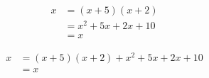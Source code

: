 \documentclass{minimal}
\begin{document}
\begin{align}
  x &= (x+5)(x+2)
 \\ &= x^2 + 5x + 2x + 10
 \\ &= x
\end{align}

\begin{align}
  x &= (x+5)(x+2)
       + x^2 + 5x + 2x + 10
 \\ &= x
\end{align}
\end{document}

